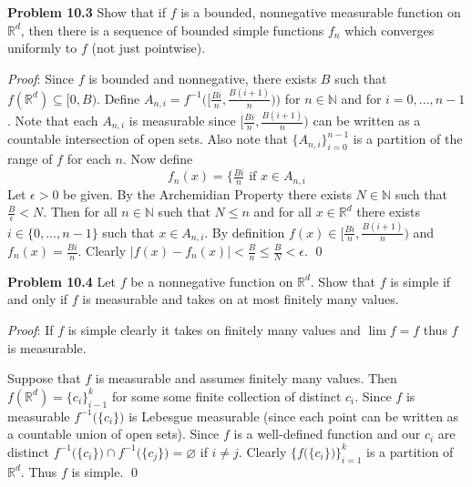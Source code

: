 \documentclass[12pt]{article}
\newcommand{\problem}[1]{\hspace{-4 ex} \large \textbf{Problem #1} }
\let\emptyset\varnothing
\renewenvironment{proof}{\hspace{-4 ex} \emph{Proof}:}{\qed}
\begin{document}
\problem{10.3} Show that if $f$ is a bounded, nonnegative measurable function on $\mathbb{R}^d$, then there is a sequence of bounded simple functions $f_n$ which converges uniformly to $f$ (not just pointwise).

	\begin{proof}
		Since $f$ is bounded and nonnegative, there exists $B$ such that \\$f(\mathbb{R}^d) \subseteq [0,B)$. Define $A_{n,i} = f^{-1}\Big( \big[\tfrac{Bi}{n}, \tfrac{B(i+1)}{n}\big)\Big)$ for $n \in \mathbb{N}$ and for $i=0,...,n-1$. 
		Note that each $A_{n,i}$ is measurable since $\big[\tfrac{Bi}{n}, \tfrac{B(i+1)}{n}\big)$ can be written as a countable intersection of open sets. 
		Also note that $\{A_{n,i}\}_{i=0}^{n-1}$ is a partition of the range of $f$ for each $n$. 
		Now define 
		$$f_n(x) = \Big\{\tfrac{Bi}{n} \text{ if }x\in A_{n,i}$$
		Let $\epsilon > 0$ be given. 
		By the Archemidian Property there exists $N \in \mathbb{N}$ such that $\tfrac{B}{\epsilon} < N$. 
		Then for all $n\in \mathbb{N}$ such that $N \leq n$ and for all $x \in \mathbb{R}^d$ there exists $i \in \{0,...,n-1\}$ such that $x \in A_{n,i}$. 
		By definition $f(x) \in \big[\tfrac{Bi}{n}, \tfrac{B(i+1)}{n}\big)$ and $f_n(x) = \tfrac{Bi}{n}$. Clearly
		$\vert f(x) - f_n(x) \vert < \tfrac{B}{n} \leq \tfrac{B}{N} < \epsilon$.
	\end{proof}

\problem{10.4} Let $f$ be a nonnegative function on $\mathbb{R}^d$. Show that $f$ is simple if and only if $f$ is measurable and takes on at most finitely many values.

	\begin{proof}
		If $f$ is simple clearly it takes on finitely many values and $\lim f = f$ thus $f$ is measurable. \bigbreak
		
		Suppose that $f$ is measurable and assumes finitely many values. 
		Then $f(\mathbb{R}^d) = \{c_i\}_{i-1}^k$ for some some finite collection of distinct $c_i$. 
		Since $f$ is measurable $f^{-1}\big(\{c_i\}\big)$ is Lebesgue measurable (since each point can be written as a countable union of open sets). 
		Since $f$ is a well-defined function and our $c_i$ are distinct $f^{-1}\big(\{c_i\}\big) \cap f^{-1}\big(\{c_j\}\big) = \emptyset $ if $i \neq j$.
		Clearly $\Big \{f \big(\{c_i\} \big) \Big\}_{i=1}^k$ is a partition of $\mathbb{R}^d$. Thus $f$ is simple. 
	\end{proof}
\end{document}
